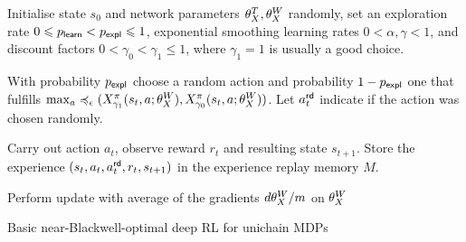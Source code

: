 \documentclass[envcountsame]{llncs}
\begin{document}
\begin{algorithm}[t!]
  \begin{algorithmic}[1]
    \State{}Initialise state \(s_{0}\) and network parameters \(\theta_X^{T}, \theta_X^{W}\) randomly, set
    an exploration rate \(0 \leqslant p_{\mathsf{learn}} < p_{\mathsf{expl}} \leqslant 1\), exponential smoothing learning rates
    \(0 < \alpha, \gamma < 1\), and discount factors
    \(0 < \gamma_{0} < \gamma_{1} \leqslant 1\), where \(\gamma_{1} = 1\) is
    usually a good choice.
    \State{}\begin{minipage}[t]{\dimexpr\textwidth-\leftmargin-\labelsep-\labelwidth}
      With probability \(p_{\mathsf{expl}}\) choose a random action and
      probability \(1-p_{\mathsf{expl}}\) one that fulfills
      \(\max_{a}\preccurlyeq_{\epsilon}(X^{\pi}_{\gamma_{1}}(s_{t},a; \theta_X^{W}{}),X^\pi_ {\gamma_{0}}(s_{t},a; \theta_X^{W}{}))\). Let
      \(a_{t}^{\mathsf{rd}}\) indicate if the action was chosen randomly.
    \end{minipage}
    \State{}\begin{minipage}[t]{\dimexpr\textwidth-\leftmargin-\labelsep-\labelwidth}
    Carry out action \(a_{t}\), observe reward \(r_{t}\) and resulting state \(s_{t+1}\).
    Store the experience \((s_{t}, a_{t}, a_{t}^{\mathsf{rd}}, r_{t}, s_{t+1})\) in the experience replay
    memory \(M\).
    \end{minipage}
    \EndIf
    \EndFor
    \State{}%
    \begin{minipage}[t]{\dimexpr\textwidth-\leftmargin-\labelsep-\labelwidth}
      Perform update with average of the gradients \(d\theta_X^{W}{}/m\)  on \(\theta_X^{W}{}\)
    \end{minipage}
    \EndWhile{}
  \end{algorithmic}
  \caption{\label{alg:near}Basic near-Blackwell-optimal deep RL for unichain MDPs}
\end{algorithm}
\end{document}
